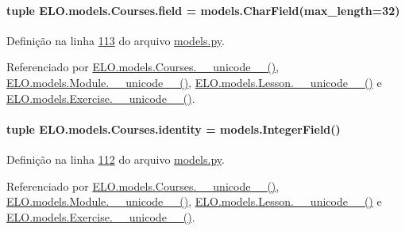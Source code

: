 \paragraph[{field}]{\setlength{\rightskip}{0pt plus 5cm}tuple E\+L\+O.\+models.\+Courses.\+field = models.\+Char\+Field(max\+\_\+length=32)\hspace{0.3cm}{\ttfamily [static]}}\label{classELO_1_1models_1_1Courses_a0ecbb317d4d82d5630b7a16a1df1711d}


Definição na linha \hyperlink{ELO_2models_8py_source_l00113}{113} do arquivo \hyperlink{ELO_2models_8py_source}{models.\+py}.



Referenciado por \hyperlink{classELO_1_1models_1_1Courses_a8676cba71b99ab2ba60726b9b5e33825}{E\+L\+O.\+models.\+Courses.\+\_\+\+\_\+unicode\+\_\+\+\_\+()}, \hyperlink{classELO_1_1models_1_1Module_a8fc9fadf09fa7b3bbcfea69ebe25d278}{E\+L\+O.\+models.\+Module.\+\_\+\+\_\+unicode\+\_\+\+\_\+()}, \hyperlink{classELO_1_1models_1_1Lesson_a53e265de97c6b73f262f62a80f9ca994}{E\+L\+O.\+models.\+Lesson.\+\_\+\+\_\+unicode\+\_\+\+\_\+()} e \hyperlink{classELO_1_1models_1_1Exercise_a23f81c66e4d6bc5a4582d74d191f5117}{E\+L\+O.\+models.\+Exercise.\+\_\+\+\_\+unicode\+\_\+\+\_\+()}.

\hypertarget{classELO_1_1models_1_1Courses_a83d1bd0bc45319f3b88446f87f42a03e}{}
\paragraph[{identity}]{\setlength{\rightskip}{0pt plus 5cm}tuple E\+L\+O.\+models.\+Courses.\+identity = models.\+Integer\+Field()\hspace{0.3cm}{\ttfamily [static]}}\label{classELO_1_1models_1_1Courses_a83d1bd0bc45319f3b88446f87f42a03e}


Definição na linha \hyperlink{ELO_2models_8py_source_l00112}{112} do arquivo \hyperlink{ELO_2models_8py_source}{models.\+py}.



Referenciado por \hyperlink{classELO_1_1models_1_1Courses_a8676cba71b99ab2ba60726b9b5e33825}{E\+L\+O.\+models.\+Courses.\+\_\+\+\_\+unicode\+\_\+\+\_\+()}, \hyperlink{classELO_1_1models_1_1Module_a8fc9fadf09fa7b3bbcfea69ebe25d278}{E\+L\+O.\+models.\+Module.\+\_\+\+\_\+unicode\+\_\+\+\_\+()}, \hyperlink{classELO_1_1models_1_1Lesson_a53e265de97c6b73f262f62a80f9ca994}{E\+L\+O.\+models.\+Lesson.\+\_\+\+\_\+unicode\+\_\+\+\_\+()} e \hyperlink{classELO_1_1models_1_1Exercise_a23f81c66e4d6bc5a4582d74d191f5117}{E\+L\+O.\+models.\+Exercise.\+\_\+\+\_\+unicode\+\_\+\+\_\+()}.

